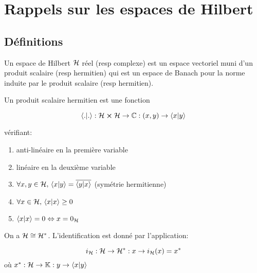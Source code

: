 \section{Rappels sur les espaces de Hilbert}

\subsection{Définitions}

\begin{definition}
	Un espace de Hilbert $\mathcal{H}$ réel (resp complexe) est un espace vectoriel
	muni d'un produit scalaire (resp hermitien) qui est un espace de Banach
	pour la norme induite par le produit scalaire (resp hermitien).
\end{definition}

\begin{definition}
	Un produit scalaire hermitien est une fonction

	\begin{equation}
		\bra{.}\ket{.} : \mathcal{H} \cross
		\mathcal{H} \rightarrow \mathbb{C} :
		(x, y) \rightarrow \bra{x}\ket{y}
	\end{equation}

	vérifiant:

	\begin{enumerate}
		\item anti-linéaire en la première variable
		\item linéaire en la deuxième variable
		\item $\forall x, y \in \mathcal{H}, \, \bra{x}\ket{y} =
			\overline{\bra{y}\ket{x}}$ (symétrie hermitienne)
		\item $\forall x \in \mathcal{H}, \, \bra{x}\ket{x} \geq 0$
		\item $\bra{x}\ket{x} = 0 \Leftrightarrow x = 0_{\mathcal{H}}$
	\end{enumerate}
\end{definition}

\begin{theorem} 
	\label{thm:repr_riesz}
	On a $\mathcal{H} \cong \mathcal{H}^{*}$.
	L'identification est donné par l'application:

	\begin{equation}
		i_{\mathcal{H}} : \mathcal{H} \rightarrow \mathcal{H}^{*} : x \rightarrow
		i_{\mathcal{H}}(x) = x^{*}
	\end{equation}
	où $x^{*} : \mathcal{H} \rightarrow \mathbb{K} : y \rightarrow
	\bra{x}\ket{y}$
\end{theorem}

